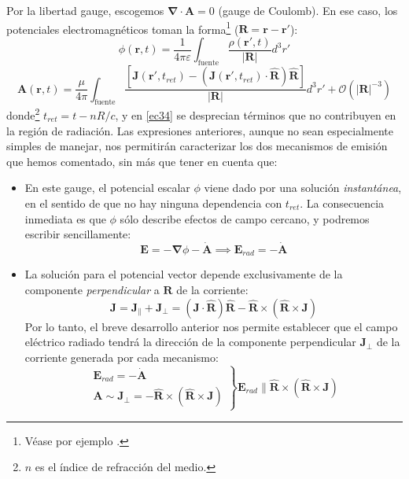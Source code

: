 \documentclass[12 pt, a4paper]{article} %
\numberwithin{equation}{section}
\numberwithin{figure}{section}
\newcommand{\vect}[1]{\boldsymbol{\mathbf{#1}}}
\begin{document}
Por la libertad gauge, escogemos $\vect{\nabla}\cdot \vect{A}=0$ (gauge de Coulomb). En ese caso, los potenciales electromagnéticos toman la forma\footnote{ Véase por ejemplo \cite{Jackson2002}.} ($\vect{R}=\vect{r}-\vect{r}'$):
\begin{equation}
	\phi(\vect{r}, t)=\frac{1}{4\pi\varepsilon}\int_{\text{fuente}} \frac{\rho(\vect{r}', t)}{\left|\vect{R}\right|}d^3r'\label{ec33}
\end{equation}
\begin{equation}
	\vect{A}\left(\vect{r}, t\right)=\frac{\mu}{4\pi}\int_{\text{fuente}}\frac{\left[\vect{J}\left(\vect{r}', t_{ret}\right)-\left(\vect{J}\left(\vect{r}', t_{ret}\right)\cdot \hat{\vect{R}}\right)\hat{\vect{R}}\right]}{\left|\vect{R}\right|}d^3r'+\mathcal{O}(\left|\vect{R}\right|^{-3})\label{ec34}
\end{equation}
donde\footnote{ $n$ es el índice de refracción del medio.} $t_{ret}=t-nR/c$, y en \eqref{ec34} se desprecian términos que no contribuyen en la región de radiación. Las expresiones anteriores, aunque no sean especialmente simples de manejar, nos permitirán caracterizar los dos mecanismos de emisión que hemos comentado, sin más que tener en cuenta que:
\begin{itemize}
	\item En este gauge, el potencial escalar $\phi$ viene dado por una solución \textit{instantánea}, en el sentido de que no hay ninguna dependencia con $t_{ret}$. La consecuencia inmediata es que $\phi$ sólo describe efectos de campo cercano, y podremos escribir sencillamente:
	\begin{equation}
		\vect{E}=-\vect{\nabla}\phi-\dot{\vect{A}}\implies \vect{E}_{rad} = -\dot{\vect{A}}\label{ec35}
	\end{equation}
\item La solución para el potencial vector depende exclusivamente de la componente \textit{perpendicular} a $\vect{R}$ de la corriente:
\begin{equation}
	\vect{J}=\vect{J}_\parallel+\vect{J}_\perp = \left(\vect{J}\cdot\hat{\vect{R}}\right)\hat{\vect{R}}-\hat{\vect{R}}\times\left(\hat{\vect{R}}\times\vect{J}\right)\label{ec36}
\end{equation} 
Por lo tanto, el breve desarrollo anterior nos permite establecer que el campo eléctrico radiado tendrá la dirección de la componente perpendicular $\vect{J}_\perp$ de la corriente generada por cada mecanismo:
\begin{equation}
	\left.
	\begin{array}{c}
		\vect{E}_{rad} = -\dot{\vect{A}}\\
		\vect{A}\sim\vect{J}_\perp=-\hat{\vect{R}}\times\left(\hat{\vect{R}}\times\vect{J}\right)
	\end{array}
\right\}\vect{E}_{rad}\parallel  \hat{\vect{R}}\times\left(\hat{\vect{R}}\times\vect{J}\right)\label{ec37}
\end{equation}
\end{itemize}
\end{document}
